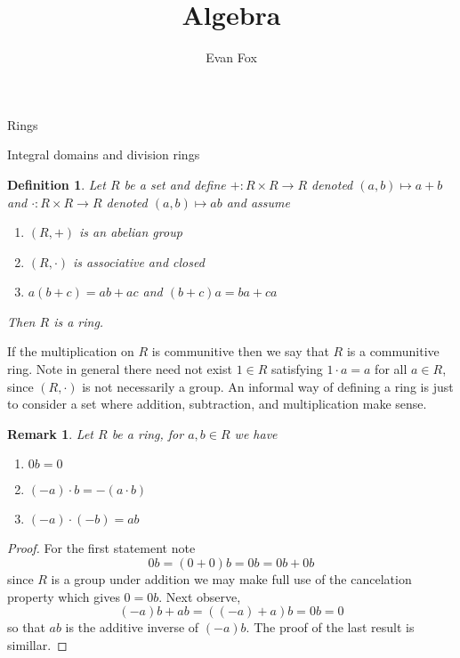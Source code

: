 \documentclass[11pt]{report}
\author{Evan Fox}
\title{Algebra}
\theoremstyle{break}
\newtheorem{defn}[thm]{Definition}
\newtheorem{rem}[thm]{Remark}
\begin{document}
\maketitle
\begin{chapter}{Rings}

\begin{section}{Integral domains and division rings}

    
    \begin{defn}
        Let $R$ be a set and define $+:R \times R \to R$ denoted $(a, b) \mapsto a + b$ and $\cdot: R \times R \to R$ denoted $(a, b) \mapsto ab$
        and assume 
        
        \begin{enumerate}
            \item $(R, +)$ is an abelian group 
            \item $(R, \cdot)$ is associative and closed 
            \item $a(b + c) = ab + ac$ and $(b + c)a = ba + ca$
        \end{enumerate}

        Then $R$ is a ring. 
    \end{defn}
If the multiplication on $R$ is communitive then we say that $R$ is a communitive ring. Note in general there need not exist $1 \in R$ satisfying $1 \cdot a = a$ for all $a \in R$, 
since $(R, \cdot)$ is not necessarily a group. An informal way of defining a ring is just to consider a set where addition, subtraction, and multiplication make sense. 

    
    \begin{rem}
        Let $R$ be a ring, for $a, b \in R$ we have 
        
        \begin{enumerate}
            \item $0b = 0$ 
            \item $(-a) \cdot b = -(a \cdot b)$
            \item $(-a) \cdot (-b) = ab $
        \end{enumerate}
    \end{rem}
    
    
    \begin{proof}
        For the first statement note 
        \[0b = (0 + 0)b = 0b = 0b + 0b\]
        since $R$ is a group under addition we may make full use of the cancelation property which gives $0 = 0b$. 
        Next observe, 
        \[(-a)b + ab = ((-a) + a)b = 0b = 0 \]
        so that $ab$ is the additive inverse of $(-a)b$. The proof of the last result is simillar. 


\end{proof}
\end{section}
\end{chapter}
\end{document}
